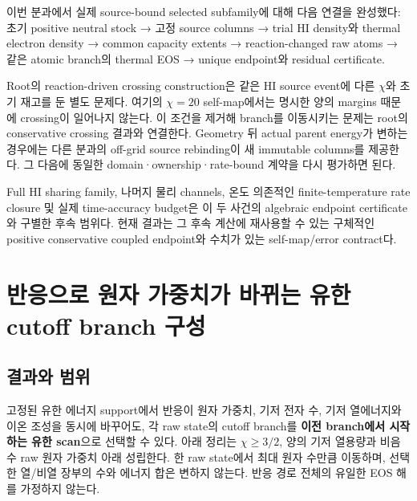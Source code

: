 \documentclass[11pt,a4paper]{article}
\begin{document}
이번 분과에서 실제 source-bound selected subfamily에 대해 다음 연결을 완성했다: 초기 positive neutral stock → 고정 source columns → trial HI density와 thermal electron density → common capacity extents → reaction-changed raw atoms → 같은 atomic branch의 thermal EOS → unique endpoint와 residual certificate.

Root의 reaction-driven crossing construction은 같은 HI source event에 다른 \(\chi\)와 초기 재고를 둔 별도 문제다. 여기의 \(\chi=20\) self-map에서는 명시한 양의 margins 때문에 crossing이 일어나지 않는다. 이 조건을 제거해 branch를 이동시키는 문제는 root의 conservative crossing 결과와 연결한다. Geometry 뒤 actual parent energy가 변하는 경우에는 다른 분과의 off-grid source rebinding이 새 immutable columns를 제공한다. 그 다음에 동일한 domain·ownership·rate-bound 계약을 다시 평가하면 된다.

Full HI sharing family, 나머지 물리 channels, 온도 의존적인 finite-temperature rate closure 및 실제 time-accuracy budget은 이 두 사건의 algebraic endpoint certificate와 구별한 후속 범위다. 현재 결과는 그 후속 계산에 재사용할 수 있는 구체적인 positive conservative coupled endpoint와 수치가 있는 self-map/error contract다.

\clearpage

\hypertarget{uxbc18uxc751uxc73cuxb85c-uxc6d0uxc790-uxac00uxc911uxce58uxac00-uxbc14uxb00cuxb294-uxc720uxd55c-cutoff-branch-uxad6cuxc131}{%
\section{반응으로 원자 가중치가 바뀌는 유한 cutoff branch 구성}\label{uxbc18uxc751uxc73cuxb85c-uxc6d0uxc790-uxac00uxc911uxce58uxac00-uxbc14uxb00cuxb294-uxc720uxd55c-cutoff-branch-uxad6cuxc131}}

\hypertarget{uxacb0uxacfcuxc640-uxbc94uxc704}{%
\subsection{결과와 범위}\label{uxacb0uxacfcuxc640-uxbc94uxc704}}

고정된 유한 에너지 support에서 반응이 원자 가중치, 기저 전자 수, 기저 열에너지와 이온 조성을 동시에 바꾸어도, 각 raw state의 cutoff branch를 \textbf{이전 branch에서 시작하는 유한 scan}으로 선택할 수 있다. 아래 정리는 \(\chi\ge3/2\), 양의 기저 열용량과 비음수 raw 원자 가중치 아래 성립한다. 한 raw state에서 최대 원자 수만큼 이동하며, 선택한 열/비열 장부의 수와 에너지 합은 변하지 않는다. 반응 경로 전체의 유일한 EOS 해를 가정하지 않는다.
\end{document}
